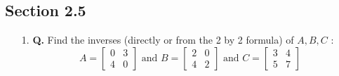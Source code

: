 \documentclass[main.tex]{subfiles}
\begin{document}
\subsection{Section 2.5}
\begin{enumerate}
    \item [1.] \textbf{Q.} Find the inverses (directly or from the 2 by 2 formula) of $A, B, C$ :
    $$
    A=\left[\begin{array}{ll}0 & 3 \\ 4 & 0\end{array}\right] \text { and } B=\left[\begin{array}{ll}2 & 0 \\ 4 & 2\end{array}\right] \text { and } C=\left[\begin{array}{ll}3 & 4 \\ 5 & 7\end{array}\right]
    $$
    

\end{enumerate}
\end{document}
